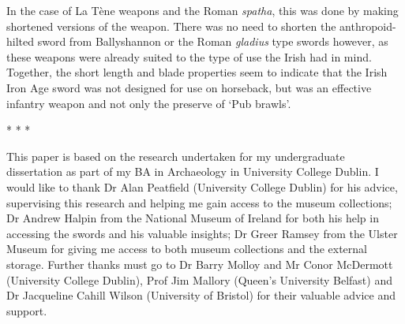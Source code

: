 In the case of La Tène weapons and the Roman \emph{spatha}, this was done by making shortened versions of the weapon. There was no need to shorten the anthropoid-hilted sword from Ballyshannon or the Roman \emph{gladius} type swords however, as these weapons were already suited to the type of use the Irish had in mind. 
Together, the short length and blade properties seem to indicate that the Irish Iron Age sword was not designed for use on horseback, but was an effective infantry weapon and not only the preserve of ‘Pub brawls’.
\vspace{2em}
\begin{center}
	* * *
\end{center}
\vspace{2em}
This paper is based on the research undertaken for my undergraduate dissertation as part of my BA in Archaeology in University College Dublin. I would like to thank Dr Alan Peatfield (University College Dublin) for his advice, supervising this research and helping me gain access to the museum collections; Dr Andrew Halpin from the National Museum of Ireland for both his help in accessing the swords and his valuable insights; Dr Greer Ramsey from the Ulster Museum for giving me access to both museum collections and the external storage. Further thanks must go to Dr Barry Molloy and Mr Conor McDermott (University College Dublin), Prof Jim Mallory (Queen’s University Belfast) and Dr Jacqueline Cahill Wilson (University of Bristol) for their valuable advice and support. 
\clearpage
